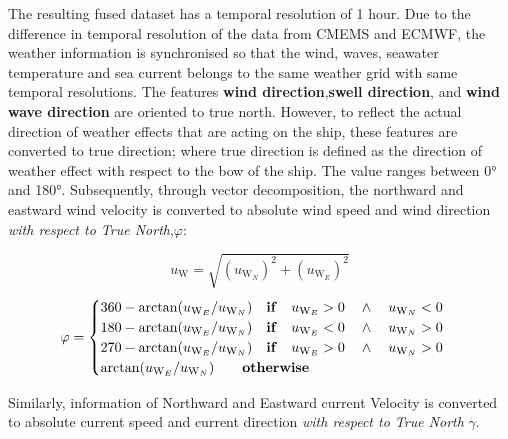 The resulting fused dataset has a temporal resolution of 1 hour. Due to the difference in temporal resolution of the data from CMEMS and ECMWF, the weather information is synchronised so that the wind, waves, seawater temperature and sea current belongs to the same weather grid with same temporal resolutions. The features \textbf{wind direction},\textbf{swell direction}, and \textbf{wind wave direction} are oriented to true north. However, to reflect the actual direction of weather effects that are acting on the ship, these features are converted to true direction; where true direction is defined as the direction of weather effect with respect to the bow of the ship. The value ranges between 0° and 180°. Subsequently, through vector decomposition, the northward and eastward wind velocity is converted to absolute wind speed and wind direction \emph{with respect to True North},$\varphi$:

\begin{equation}\label{eqn:vwindabs}
    u_{\text{W}} = \sqrt{(u_{\text{W}_{N}})^2 + (u_{\text{W}_{E}})^2} 
\end{equation}
\begin{equation}\label{eqn:winddir}
    \varphi = 
    \begin{cases}
        360 - \arctan(u_{\text{W}_{E}} / u_{\text{W}_{N}}) \quad \text{\textbf{if}} \quad u_{\text{W}_{E}} > 0 \quad \wedge \quad u_{\text{W}_{N}} < 0 \\ 
        180 - \arctan(u_{\text{W}_{E}} / u_{\text{W}_{N}}) \quad \text{\textbf{if}} \quad u_{\text{W}_{E}} < 0 \quad \wedge \quad u_{\text{W}_{N}} > 0 \\ 
        270 - \arctan(u_{\text{W}_{E}} / u_{\text{W}_{N}}) \quad \text{\textbf{if}} \quad u_{\text{W}_{E}} > 0 \quad \wedge \quad u_{\text{W}_{N}} > 0 \\
        \arctan(u_{\text{W}_{E}} / u_{\text{W}_{N}}) \qquad \text{\textbf{otherwise}} 
    \end{cases}   
\end{equation}

Similarly, information of Northward and Eastward current Velocity is converted to absolute current speed and current direction \emph{with respect to True North} $\gamma$.\\ 

